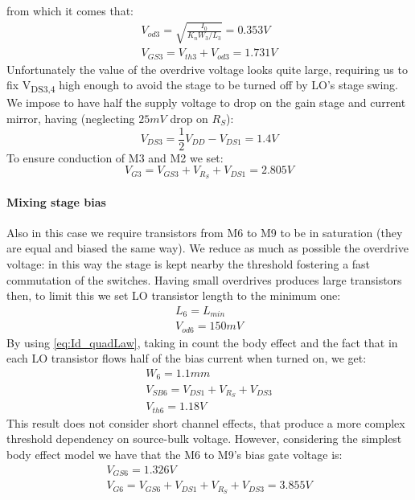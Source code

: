 from which it comes that:
\begin{gather}
	V_{od3}=\sqrt{\frac{I_0}{K_n W_3/L_3}} = 0.353 V \\
	V_{GS3} = V_{th3}+V_{od3} = 1.731 V
\end{gather}
Unfortunately the value of the overdrive voltage looks quite large, requiring us to fix V\textsubscript{DS3,4} high enough to avoid the stage to be turned off by LO's stage swing. We impose to have half the supply voltage to drop on the gain stage and current mirror, having (neglecting $25mV$ drop on $R_S$):
\begin{equation}
	V_{DS3} = \frac{1}{2}V_{DD}-V_{DS1} = 1.4 V
\end{equation}
To ensure conduction of M3 and M2 we set:
\begin{equation}
	V_{G3}=V_{GS3} +V_{R_{S}}+V_{DS1} = 2.805 V 
\end{equation}

\paragraph{Mixing stage bias}

Also in this case we require transistors from M6 to M9 to be in saturation (they are equal and biased the same way). We reduce as much as possible the overdrive voltage: in this way the stage is kept nearby the threshold fostering a fast commutation of the switches. Having small overdrives produces large transistors then, to limit this we set LO transistor length to the minimum one:
\begin{gather}
	L_6 = L_{min}  \\
	V_{od6} = 150mV 
\end{gather}
By using \ref{eq:Id_quadLaw}, taking in count the body effect and the fact that in each LO transistor flows half of the bias current when turned on, we get:
\begin{gather}
W_6 = 1.1mm \\
V_{SB6} = V_{DS1}+V_{R_S}+V_{DS3}\\
V_{th6} = 1.18V
\end{gather}
This result does not consider short channel effects, that produce a more complex threshold dependency on source-bulk voltage. However, considering the simplest body effect model we have that the M6 to M9's bias gate voltage is:
\begin{gather}
	V_{GS6}=1.326V \\
	V_{G6} = V_{GS6}+V_{DS1}+V_{R_S}+V_{DS3} = 3.855V
\end{gather}







